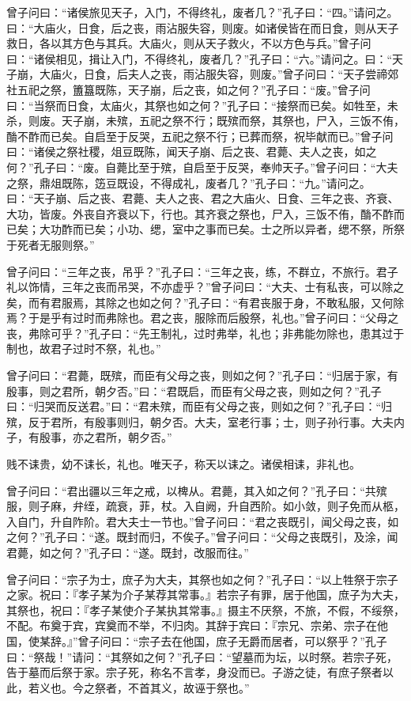 \documentclass[]{article}
\begin{document}
曾子问曰：``诸侯旅见天子，入门，不得终礼，废者几？''孔子曰：``四。''请问之。曰：``大庙火，日食，后之丧，雨沾服失容，则废。如诸侯皆在而日食，则从天子救日，各以其方色与其兵。大庙火，则从天子救火，不以方色与兵。''曾子问曰：``诸侯相见，揖让入门，不得终礼，废者几？''孔子曰：``六。''请问之。曰：``天子崩，大庙火，日食，后夫人之丧，雨沾服失容，则废。''曾子问曰：``天子尝禘郊社五祀之祭，簠簋既陈，天子崩，后之丧，如之何？''孔子曰：``废。''曾子问曰：``当祭而日食，太庙火，其祭也如之何？''孔子曰：``接祭而已矣。如牲至，未杀，则废。天子崩，未殡，五祀之祭不行；既殡而祭，其祭也，尸入，三饭不侑，酳不酢而已矣。自启至于反哭，五祀之祭不行；已葬而祭，祝毕献而已。''曾子问曰：``诸侯之祭社稷，俎豆既陈，闻天子崩、后之丧、君薨、夫人之丧，如之何？''孔子曰：``废。自薨比至于殡，自启至于反哭，奉帅天子。''曾子问曰：``大夫之祭，鼎俎既陈，笾豆既设，不得成礼，废者几？''孔子曰：``九。''请问之。曰：``天子崩、后之丧、君薨、夫人之丧、君之大庙火、日食、三年之丧、齐衰、大功，皆废。外丧自齐衰以下，行也。其齐衰之祭也，尸入，三饭不侑，酳不酢而已矣；大功酢而已矣；小功、缌，室中之事而已矣。士之所以异者，缌不祭，所祭于死者无服则祭。''

曾子问曰：``三年之丧，吊乎？''孔子曰：``三年之丧，练，不群立，不旅行。君子礼以饰情，三年之丧而吊哭，不亦虚乎？''曾子问曰：``大夫、士有私丧，可以除之矣，而有君服焉，其除之也如之何？''孔子曰：``有君丧服于身，不敢私服，又何除焉？于是乎有过时而弗除也。君之丧，服除而后殷祭，礼也。''曾子问曰：``父母之丧，弗除可乎？''孔子曰：``先王制礼，过时弗举，礼也；非弗能勿除也，患其过于制也，故君子过时不祭，礼也。''

曾子问曰：``君薨，既殡，而臣有父母之丧，则如之何？''孔子曰：``归居于家，有殷事，则之君所，朝夕否。''曰：``君既启，而臣有父母之丧，则如之何？''孔子曰：``归哭而反送君。''曰：``君未殡，而臣有父母之丧，则如之何？''孔子曰：``归殡，反于君所，有殷事则归，朝夕否。大夫，室老行事；士，则子孙行事。大夫内子，有殷事，亦之君所，朝夕否。''

贱不诔贵，幼不诔长，礼也。唯天子，称天以诔之。诸侯相诔，非礼也。

曾子问曰：``君出疆以三年之戒，以椑从。君薨，其入如之何？''孔子曰：``共殡服，则子麻，弁绖，疏衰，菲，杖。入自阙，升自西阶。如小敛，则子免而从柩，入自门，升自阼阶。君大夫士一节也。''曾子问曰：``君之丧既引，闻父母之丧，如之何？''孔子曰：``遂。既封而归，不俟子。''曾子问曰：``父母之丧既引，及涂，闻君薨，如之何？''孔子曰：``遂。既封，改服而往。''

曾子问曰：``宗子为士，庶子为大夫，其祭也如之何？''孔子曰：``以上牲祭于宗子之家。祝曰：『孝子某为介子某荐其常事。』若宗子有罪，居于他国，庶子为大夫，其祭也，祝曰：『孝子某使介子某执其常事。』摄主不厌祭，不旅，不假，不绥祭，不配。布奠于宾，宾奠而不举，不归肉。其辞于宾曰：『宗兄、宗弟、宗子在他国，使某辞。』''曾子问曰：``宗子去在他国，庶子无爵而居者，可以祭乎？''孔子曰：``祭哉！''请问：``其祭如之何？''孔子曰：``望墓而为坛，以时祭。若宗子死，告于墓而后祭于家。宗子死，称名不言孝，身没而已。子游之徒，有庶子祭者以此，若义也。今之祭者，不首其义，故诬于祭也。''
\end{document}
